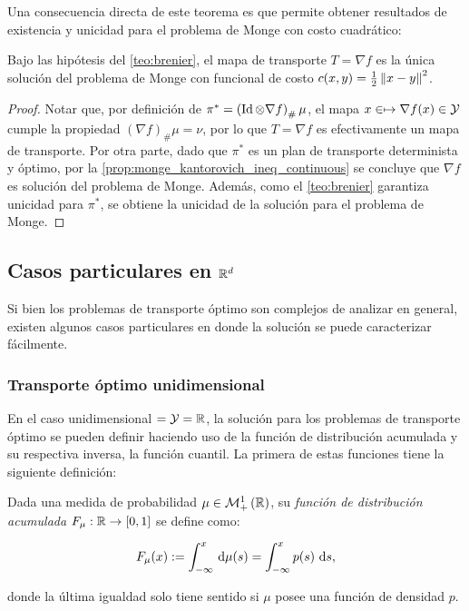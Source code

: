 Una consecuencia directa de este teorema es que permite obtener resultados de existencia y unicidad para el problema de Monge con costo cuadrático:

\begin{cor}
	Bajo las hipótesis del \autoref{teo:brenier}, el mapa de transporte $T=\nabla f$ es la única solución del problema de Monge con funcional de costo $c(x,y)=\frac{1}{2}\left\lVert x-y \right\rVert^2$.
\end{cor}

\begin{proof}
	Notar que, por definición de $\pi^* = \left(\operatorname{Id}\otimes \nabla f\right)_\#\mu$, el mapa $x\in \mapsto \nabla f(x)\in\mathcal{Y}$ cumple la propiedad $(\nabla f)_\#\mu=\nu$, por lo que $T=\nabla f$ es efectivamente un mapa de transporte. Por otra parte, dado que $\pi^*$ es un plan de transporte determinista y óptimo, por la \autoref{prop:monge_kantorovich_ineq_continuous} se concluye que $\nabla f$ es solución del problema de Monge. Además, como el \autoref{teo:brenier} garantiza unicidad para $\pi^*$, se obtiene la unicidad de la solución para el problema de Monge.
\end{proof}

\subsection{Casos particulares en \texorpdfstring{$\mathbb{R}^d$}{Rd}}
\label{ot/kantorovich/rd}

Si bien los problemas de transporte óptimo son complejos de analizar en general, existen algunos casos particulares en donde la solución se puede caracterizar fácilmente.

\subsubsection{Transporte óptimo unidimensional}

En el caso unidimensional $=\mathcal{Y}=\mathbb{R}$, la solución para los problemas de transporte óptimo se pueden definir haciendo uso de la función de distribución acumulada y su respectiva inversa, la función cuantil. La primera de estas funciones tiene la siguiente definición:

\begin{defn}

	Dada una medida de probabilidad $\mu\in\mathcal{M}_+^1\left(\mathbb{R}\right)$, su \textit{función de distribución acumulada} $F_\mu:\mathbb{R}\to[0,1]$ se define como:

	\begin{equation*}
		F_\mu(x) := \int_{-\infty}^x \,\operatorname{d}\!\mu(s) = \int_{-\infty}^x p(s)\,\operatorname{d}\! s,
	\end{equation*}

	donde la última igualdad solo tiene sentido si $\mu$ posee una función de densidad $p$.

\end{defn}

